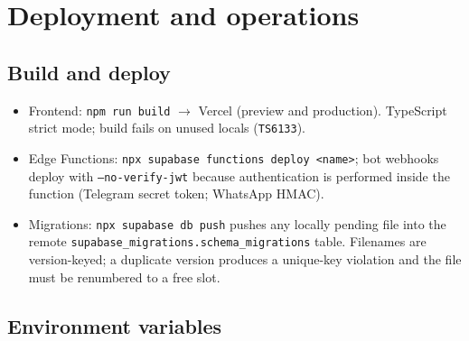 \documentclass[11pt,a4paper,oneside]{article}
\newcommand{\code}[1]{\texttt{\small #1}}
\begin{document}
\section{Deployment and operations}\label{sec:ops}

\subsection{Build and deploy}

\begin{itemize}
  \item Frontend: \code{npm run build} $\to$ Vercel (preview and
    production). TypeScript strict mode; build fails on unused locals
    (\code{TS6133}).
  \item Edge Functions: \code{npx supabase functions deploy <name>};
    bot webhooks deploy with \code{--no-verify-jwt} because
    authentication is performed inside the function (Telegram secret
    token; WhatsApp HMAC).
  \item Migrations: \code{npx supabase db push} pushes any locally
    pending file into the remote
    \code{supabase\_migrations.schema\_migrations} table. Filenames
    are version-keyed; a duplicate version produces a unique-key
    violation and the file must be renumbered to a free slot.
\end{itemize}

\subsection{Environment variables}
\end{document}
